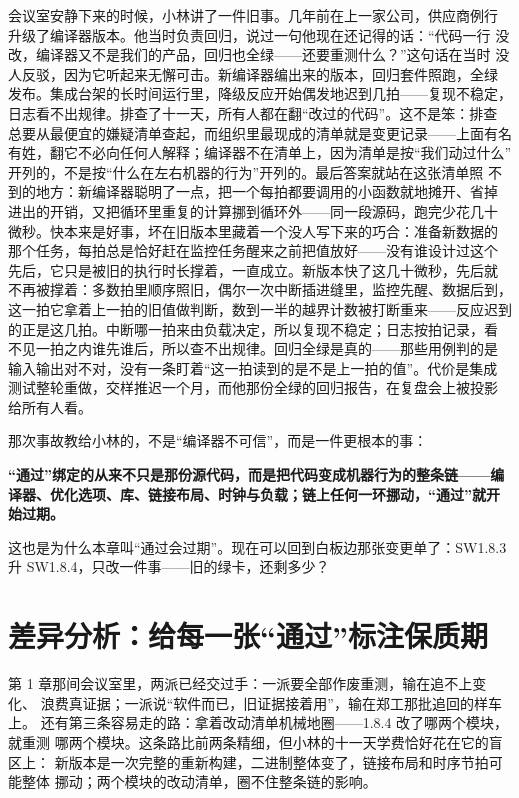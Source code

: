 会议室安静下来的时候，小林讲了一件旧事。几年前在上一家公司，供应商例行
升级了编译器版本。他当时负责回归，说过一句他现在还记得的话：“代码一行
没改，编译器又不是我们的产品，回归也全绿——还要重测什么？”这句话在当时
没人反驳，因为它听起来无懈可击。新编译器编出来的版本，回归套件照跑，全绿
发布。集成台架的长时间运行里，降级反应开始偶发地迟到几拍——复现不稳定，
日志看不出规律。排查了十一天，所有人都在翻“改过的代码”。这不是笨：排查
总要从最便宜的嫌疑清单查起，而组织里最现成的清单就是变更记录——上面有名
有姓，翻它不必向任何人解释；编译器不在清单上，因为清单是按“我们动过什么”
开列的，不是按“什么在左右机器的行为”开列的。最后答案就站在这张清单照
不到的地方：新编译器聪明了一点，把一个每拍都要调用的小函数就地摊开、省掉
进出的开销，又把循环里重复的计算挪到循环外——同一段源码，跑完少花几十
微秒。快本来是好事，坏在旧版本里藏着一个没人写下来的巧合：准备新数据的
那个任务，每拍总是恰好赶在监控任务醒来之前把值放好——没有谁设计过这个
先后，它只是被旧的执行时长撑着，一直成立。新版本快了这几十微秒，先后就
不再被撑着：多数拍里顺序照旧，偶尔一次中断插进缝里，监控先醒、数据后到，
这一拍它拿着上一拍的旧值做判断，数到一半的越界计数被打断重来——反应迟到
的正是这几拍。中断哪一拍来由负载决定，所以复现不稳定；日志按拍记录，看
不见一拍之内谁先谁后，所以查不出规律。回归全绿是真的——那些用例判的是
输入输出对不对，没有一条盯着“这一拍读到的是不是上一拍的值”。代价是集成
测试整轮重做，交样推迟一个月，而他那份全绿的回归报告，在复盘会上被投影
给所有人看。

那次事故教给小林的，不是“编译器不可信”，而是一件更根本的事：

\textbf{“通过”绑定的从来不只是那份源代码，而是把代码变成机器行为的整条链——编译器、优化选项、库、链接布局、时钟与负载；链上任何一环挪动，“通过”就开始过期。}

这也是为什么本章叫“通过会过期”。现在可以回到白板边那张变更单了：SW1.8.3
升 SW1.8.4，只改一件事——旧的绿卡，还剩多少？

\section{差异分析：给每一张“通过”标注保质期}

第 1 章那间会议室里，两派已经交过手：一派要全部作废重测，输在追不上变化、
浪费真证据；一派说“软件而已，旧证据接着用”，输在郑工那批追回的样车上。
还有第三条容易走的路：拿着改动清单机械地圈——1.8.4 改了哪两个模块，就重测
哪两个模块。这条路比前两条精细，但小林的十一天学费恰好花在它的盲区上：
新版本是一次完整的重新构建，二进制整体变了，链接布局和时序节拍可能整体
挪动；两个模块的改动清单，圈不住整条链的影响。

